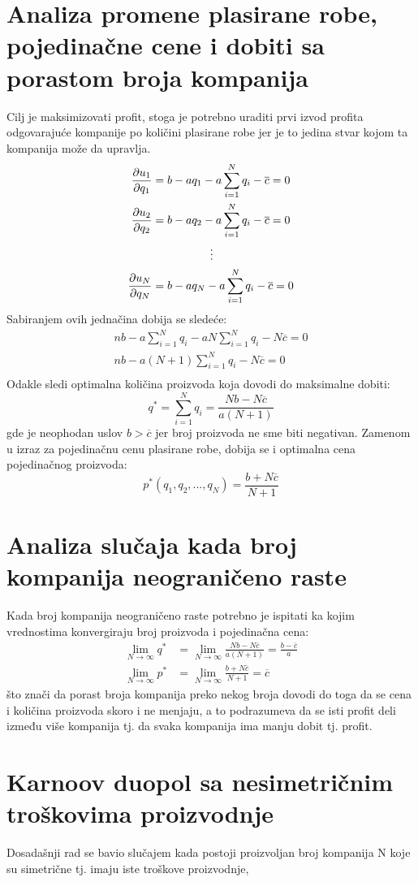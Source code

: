 \documentclass[12pt]{article}
\begin{document}
\section{Analiza promene plasirane robe, pojedinačne cene i dobiti sa porastom
broja kompanija}
\par Cilj je maksimizovati profit, stoga je potrebno uraditi prvi izvod profita
odgovarajuće kompanije po količini plasirane robe jer je to jedina stvar kojom
ta kompanija može da upravlja.
\begin{align*}
	\frac{\partial u_1}{\partial q_1} &= b - a q_1 - a \sum_{i=1}^N q_i
	- \overline{c} = 0\\ 
	\frac{\partial u_2}{\partial q_2} &= b - a q_2 - a \sum_{i=1}^N q_i
	- \overline{c} = 0\\ 
		&\hspace{1.8cm}\vdots \\
	\frac{\partial u_N}{\partial q_N} &= b - a q_N - a \sum_{i=1}^N q_i
	- \overline{c} = 0 \\ 
\end{align*}
Sabiranjem ovih jednačina dobija se sledeće:
\begin{gather*} 	
	n b - a \sum_{i=1}^N q_i - a N \sum_{i=1}^N q_i
	- N \overline{c} = 0 \\
	n b - a (N+1) \sum_{i=1}^N q_i - N \overline{c} = 0 \\
\end{gather*}
Odakle sledi optimalna količina proizvoda koja dovodi do maksimalne dobiti:
\begin{equation}
	q^* = \sum_{i=1}^N q_i = \frac{N b - N \overline{c}}{a (N+1)}
\end{equation}
gde je neophodan uslov $b > \overline{c}$ jer broj proizvoda ne sme biti
negativan.
Zamenom u izraz za pojedinačnu cenu plasirane robe, dobija se i optimalna cena
pojedinačnog proizvoda:
\begin{equation}
	p^* (q_1, q_2, ..., q_N) = \frac{b + N \overline{c}}{N+1}
\end{equation}
\section{Analiza slučaja kada broj kompanija neograničeno raste}
\par Kada broj kompanija neograničeno raste potrebno je ispitati ka kojim
vrednostima konvergiraju broj proizvoda i pojedinačna cena:
\begin{align*}
	\lim_{N \rightarrow \infty} q^*
	&= \lim_{N \rightarrow \infty} \frac{N b - N \overline{c}}{a (N+1)}
	= \frac{b - \overline{c}}{a} \\
	\lim_{N \rightarrow \infty} p^*
	&= \lim_{N \rightarrow \infty} \frac{b + N \overline{c}}{N+1}
	= \overline{c}
\end{align*}
što znači da porast broja kompanija preko nekog broja dovodi do toga da se
cena i količina proizvoda skoro i ne menjaju, a to podrazumeva da se isti
profit deli između više kompanija tj. da svaka kompanija ima manju dobit tj.
profit.
\section{Karnoov duopol sa nesimetričnim troškovima proizvodnje}
\par Dosadašnji rad se bavio slučajem kada postoji proizvoljan broj kompanija
N koje su simetrične tj. imaju iste troškove proizvodnje, 
\end{document}
